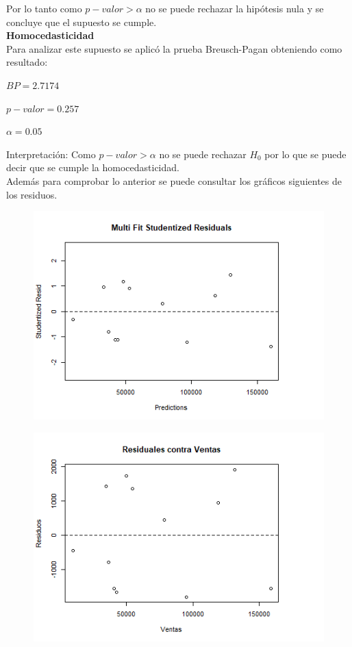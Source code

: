 \documentclass[12pt,a4paper]{article}
\begin{document}
	Por lo tanto como $p-valor > \alpha$ no se puede rechazar la hipótesis nula y se concluye que el supuesto se cumple.\\

	
	\textbf{Homocedasticidad}\\
	Para analizar este supuesto se aplicó la prueba Breusch-Pagan obteniendo como resultado:
	
	\begin{center}
		$BP = 2.7174$
		
		$p-valor = 0.257$
		
		$\alpha = 0.05$
	\end{center}
	
	Interpretación: Como $p-valor > \alpha$ no se puede rechazar $H_0$ por lo que se puede decir que se cumple la homocedasticidad.\\
	
	Además para comprobar lo anterior se puede consultar los gráficos siguientes de los residuos.
		
	\begin{figure}[!h]
		\centering
		\includegraphics[scale= 0.6]{./images/MFDR1.png}
		\caption{\small{ }}
	\end{figure}
	
	\begin{figure}[!h]
		\centering
		\includegraphics[scale= 0.6]{./images/RVV1.png}
		\caption{\small{  }}
	\end{figure}
\end{document}
